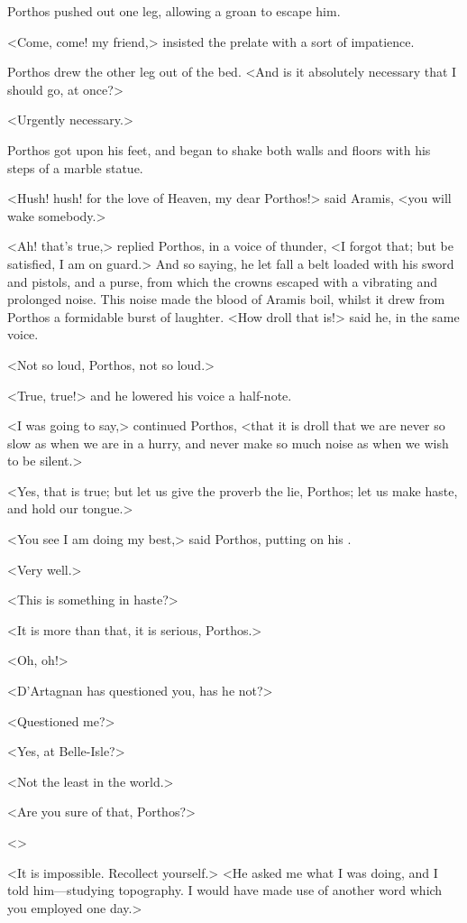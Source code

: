 Porthos pushed out one leg, allowing a groan to escape him.

<Come, come! my friend,> insisted the prelate with a sort of impatience.

Porthos drew the other leg out of the bed. <And is it absolutely necessary that I should go, at once?>

<Urgently necessary.>

Porthos got upon his feet, and began to shake both walls and floors with his steps of a marble statue.

<Hush! hush! for the love of Heaven, my dear Porthos!> said Aramis, <you will wake somebody.>

<Ah! that's true,> replied Porthos, in a voice of thunder, <I forgot that; but be satisfied, I am on guard.> And so saying, he let fall a belt loaded with his sword and pistols, and a purse, from which the crowns escaped with a vibrating and prolonged noise. This noise made the blood of Aramis boil, whilst it drew from Porthos a formidable burst of laughter. <How droll that is!> said he, in the same voice.

<Not so loud, Porthos, not so loud.>

<True, true!> and he lowered his voice a half-note.

<I was going to say,> continued Porthos, <that it is droll that we are never so slow as when we are in a hurry, and never make so much noise as when we wish to be silent.>

<Yes, that is true; but let us give the proverb the lie, Porthos; let us make haste, and hold our tongue.>

<You see I am doing my best,> said Porthos, putting on his .

<Very well.>

<This is something in haste?>

<It is more than that, it is serious, Porthos.>

<Oh, oh!>

<D'Artagnan has questioned you, has he not?>

<Questioned me?>

<Yes, at Belle-Isle?>

<Not the least in the world.>

<Are you sure of that, Porthos?>

<>

<It is impossible. Recollect yourself.> <He asked me what I was doing, and I told him—studying topography. I would have made use of another word which you employed one day.>

